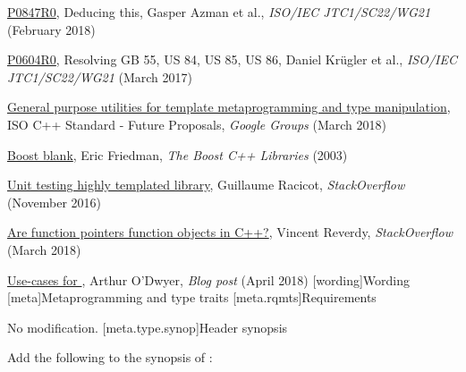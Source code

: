 \documentclass[ebook,10pt,oneside,openany,final]{memoir}
\begin{document}
\href{http://www.open-std.org/jtc1/sc22/wg21/docs/papers/2018/p0847r0.html}{P0847R0}, Deducing this, Gasper Azman et al., \emph{ISO/IEC JTC1/SC22/WG21} (February 2018)

\href{http://www.open-std.org/jtc1/sc22/wg21/docs/papers/2017/p0604r0.html}{P0604R0}, Resolving GB 55, US 84, US 85, US 86, Daniel Kr\"ugler et al., \emph{ISO/IEC JTC1/SC22/WG21} (March 2017)

\href{https://groups.google.com/a/isocpp.org/forum/#!topic/std-proposals/R04CWOjABIQ}{General purpose utilities for template metaprogramming and type manipulation}, ISO C++ Standard - Future Proposals, \emph{Google Groups} (March 2018)

\href{https://www.boost.org/doc/libs/1_66_0/boost/blank.hpp}{Boost blank}, Eric Friedman, \emph{The Boost C++ Libraries} (2003)

\href{https://stackoverflow.com/q/40681645}{Unit testing highly templated library}, Guillaume Racicot, \emph{StackOverflow} (November 2016)

\href{https://stackoverflow.com/q/49503229}{Are function pointers function objects in C++?}, Vincent Reverdy, \emph{StackOverflow} (March 2018)

\href{https://quuxplusone.github.io/blog/2018/04/02/false-v/}{Use-cases for }, Arthur O'Dwyer, \emph{Blog post} (April 2018)
[wording]{Wording}
[meta]{Metaprogramming and type traits}
[meta.rqmts]{Requirements}

\pnum
No modification.
[meta.type.synop]{Header  synopsis}

\pnum
Add the following to the synopsis of :
\end{document}
